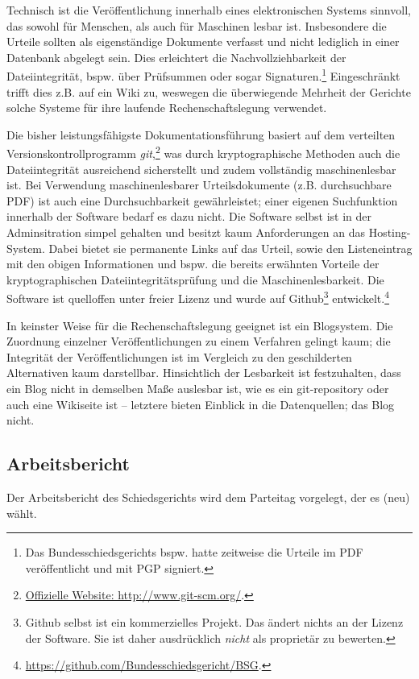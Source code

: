 Technisch ist die Veröffentlichung innerhalb eines elektronischen Systems sinnvoll, das sowohl für Menschen, als auch für Maschinen lesbar ist.
Insbesondere die Urteile sollten als eigenständige Dokumente verfasst und nicht lediglich in einer Datenbank abgelegt sein.
Dies erleichtert die Nachvollziehbarkeit der Dateiintegrität, bspw. über Prüfsummen oder sogar Signaturen.\footnote{Das Bundesschiedsgerichts bspw. hatte zeitweise die Urteile im PDF veröffentlicht und mit PGP signiert.}
Eingeschränkt trifft dies z.B. auf ein Wiki zu, weswegen die überwiegende Mehrheit der Gerichte solche Systeme für ihre laufende Rechenschaftslegung verwendet.

Die bisher leistungsfähigste Dokumentationsführung basiert auf dem verteilten Versionskontrollprogramm \emph{git},\footnote{\href{http://www.git-scm.org/}{Offizielle Website: http://www.git-scm.org/}.} was durch kryptographische Methoden auch die Dateiintegrität ausreichend sicherstellt und zudem vollständig maschinenlesbar ist.
Bei Verwendung maschinenlesbarer Urteilsdokumente (z.B. durchsuchbare PDF) ist auch eine Durchsuchbarkeit gewährleistet; einer eigenen Suchfunktion innerhalb der Software bedarf es dazu nicht.
Die Software selbst ist in der Adminsitration simpel gehalten und besitzt kaum Anforderungen an das Hosting-System.
Dabei bietet sie permanente Links auf das Urteil, sowie den Listeneintrag mit den obigen Informationen und bspw. die bereits erwähnten Vorteile der kryptographischen Dateiintegritätsprüfung und die Maschinenlesbarkeit.
Die Software ist quelloffen unter freier Lizenz und wurde auf Github\footnote{Github selbst ist ein kommerzielles Projekt. Das ändert nichts an der Lizenz der Software. Sie ist daher ausdrücklich \emph{nicht} als proprietär zu bewerten.} entwickelt.\footnote{\href{https://github.com/Bundesschiedsgericht/BSG}{https://github.com/Bundesschiedsgericht/BSG}.}

In keinster Weise für die Rechenschaftslegung geeignet ist ein Blogsystem.
Die Zuordnung einzelner Veröffentlichungen zu einem Verfahren gelingt kaum; die Integrität der Veröffentlichungen ist im Vergleich zu den geschilderten Alternativen kaum darstellbar.
Hinsichtlich der Lesbarkeit ist festzuhalten, dass ein Blog nicht in demselben Maße auslesbar ist, wie es ein git-repository oder auch eine Wikiseite ist -- letztere bieten Einblick in die Datenquellen; das Blog nicht.

\subsection{Arbeitsbericht}
\label{Dokumentation:Rechenschaftslegung:Arbeitsbericht}
Der Arbeitsbericht des Schiedsgerichts wird dem Parteitag vorgelegt, der es (neu) wählt.

